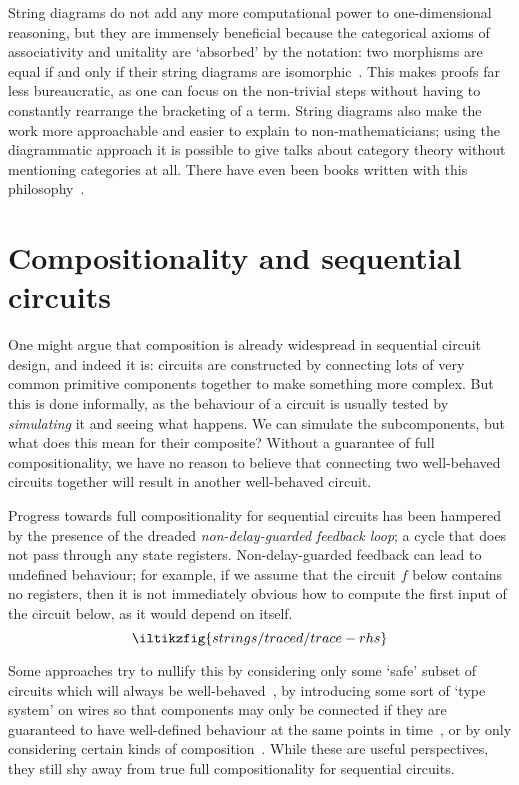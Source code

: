 String diagrams do not add any more computational power to one-dimensional
reasoning, but they are
immensely beneficial because the categorical axioms of associativity and
unitality are `absorbed' by the notation: two morphisms are equal if and only if
their string diagrams are isomorphic~\cite{kelly1980coherence,kissinger2014abstract}.
This makes proofs far less bureaucratic, as one can focus on the non-trivial
steps without having to constantly rearrange the bracketing of a term.
String diagrams also make the work more approachable and easier to explain to
non-mathematicians; using the diagrammatic approach it is possible to give talks
about category theory without mentioning categories at all.
There have even been books written with this
philosophy~\cite{coecke2018picturing}.


\section{Compositionality and sequential circuits}

One might argue that composition is already widespread in sequential circuit
design, and indeed it is: circuits are constructed by connecting lots of very
common primitive components together to make something more complex.
But this is done informally, as the behaviour of a circuit is usually tested
by \emph{simulating} it and seeing what happens.
We can simulate the subcomponents, but what does this mean for their composite?
Without a guarantee of full compositionality, we have no reason to
believe that connecting two well-behaved circuits together will result in
another well-behaved circuit.

Progress towards full compositionality for sequential circuits has been hampered
by the presence of the dreaded \emph{non-delay-guarded feedback loop}; a cycle
that does not pass through any state registers.
Non-delay-guarded feedback can lead to undefined behaviour; for example, if we
assume that the circuit \(f\) below contains no registers, then it is not
immediately obvious how to compute the first input of the circuit below, as it
would depend on itself.
\[
    \iltikzfig{strings/traced/trace-rhs}
\]

Some approaches try to nullify this by considering only some `safe' subset of
circuits which will always be well-behaved~\cite{christensen2021wire}, by
introducing some sort of `type system' on wires so that components may only be
connected if they are guaranteed to have well-defined behaviour at the same
points in time~\cite{nigam2023modular}, or by only considering certain kinds of
composition~\cite{alekseyev2014compositional}.
While these are useful perspectives, they still shy away from true full
compositionality for sequential circuits.


